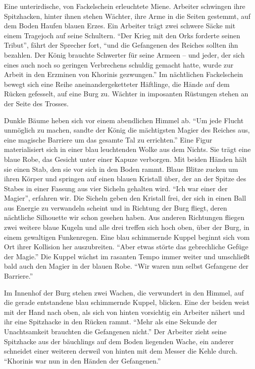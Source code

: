 \documentclass[a5paper,pagesize]{scrbook}
\begin{document}
Eine unterirdische, von Fackelschein erleuchtete Miene.
Arbeiter schwingen ihre Spitzhacken, hinter ihnen stehen Wächter, ihre Arme in die Seiten gestemmt, auf dem Boden Haufen blauen Erzes.
Ein Arbeiter trägt zwei schwere Säcke mit einem Tragejoch auf seine Schultern.
\enquote{Der Krieg mit den Orks forderte seinen Tribut}, fährt der Sprecher fort, \enquote{und die Gefangenen des Reiches sollten ihn bezahlen.
Der König brauchte Schwerter für seine Armeen -- und jeder, der sich eines auch noch so geringen Verbrechens schuldig gemacht hatte, wurde zur Arbeit in den Erzminen von Khorinis gezwungen.}
Im nächtlichen Fackelschein bewegt sich eine Reihe aneinandergeketteter Häftlinge, die Hände auf dem Rücken gefesselt, auf eine Burg zu.
Wächter in imposanten Rüstungen stehen an der Seite des Trosses.

Dunkle Bäume heben sich vor einem abendlichen Himmel ab.
\enquote{Um jede Flucht unmöglich zu machen, sandte der König die mächtigsten Magier des Reiches aus, eine magische Barriere um das gesamte Tal zu errichten.}
Eine Figur materialisiert sich in einer blau leuchtenden Wolke aus dem Nichts.
Sie trägt eine blaue Robe, das Gesicht unter einer Kapuze verborgen.
Mit beiden Händen hält sie einen Stab, den sie vor sich in den Boden rammt.
Blaue Blitze zucken um ihren Körper und springen auf einen blauen Kristall über, der an der Spitze des Stabes in einer Fassung aus vier Sicheln gehalten wird.
\enquote{Ich war einer der Magier}, erfahren wir.
Die Sicheln geben den Kristall frei, der sich in einen Ball aus Energie zu verwandeln scheint und in Richtung der Burg fliegt, deren nächtliche Silhouette wir schon gesehen haben.
Aus anderen Richtungen fliegen zwei weitere blaue Kugeln und alle drei treffen sich hoch oben, über der Burg, in einem gewaltigen Funkenregen.
Eine blau schimmernde Kuppel beginnt sich vom Ort ihrer Kollision her auszubreiten.
\enquote{Aber etwas störte das gebrechliche Gefüge der Magie.}
Die Kuppel wächst im rasanten Tempo immer weiter und umschließt bald auch den Magier in der blauen Robe.
\enquote{Wir waren nun selbst Gefangene der Barriere.}

Im Innenhof der Burg stehen zwei Wachen, die verwundert in den Himmel, auf die gerade entstandene blau schimmernde Kuppel, blicken.
Eine der beiden weist mit der Hand nach oben, als sich von hinten vorsichtig ein Arbeiter nähert und ihr eine Spitzhacke in den Rücken rammt.
\enquote{Mehr als eine Sekunde der Unachtsamkeit brauchten die Gefangenen nicht.}
Der Arbeiter zieht seine Spitzhacke aus der bäuchlings auf dem Boden liegenden Wache, ein anderer schneidet einer weiteren derweil von hinten mit dem Messer die Kehle durch.
\enquote{Khorinis war nun in den Händen der Gefangenen.}
\end{document}
